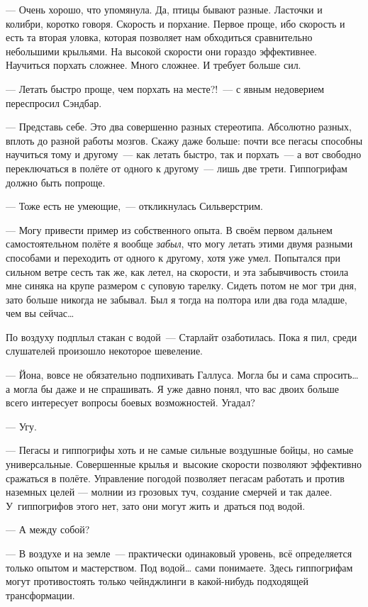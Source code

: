 \documentclass[fontsize=11pt,a5paper,titlepage=firstcover]{scrbook}
\begin{document}
--- Очень хорошо, что упомянула. Да, птицы бывают разные. Ласточки и колибри, коротко говоря. Скорость и порхание. Первое проще, ибо скорость и есть та вторая уловка, которая позволяет нам обходиться сравнительно небольшими крыльями. На высокой скорости они гораздо эффективнее. Научиться порхать сложнее. Много сложнее. И требует больше сил.

--- Летать быстро проще, чем порхать на месте?!~--- с явным недоверием переспросил Сэндбар.

--- Представь себе. Это два совершенно разных стереотипа. Абсолютно разных, вплоть до разной работы мозгов. Скажу даже больше: почти все пегасы способны научиться тому и другому~--- как летать быстро, так и порхать~--- а вот свободно переключаться в полёте от одного к другому~--- лишь две трети. Гиппогрифам должно быть попроще.

--- Тоже есть не умеющие,~--- откликнулась Сильверстрим.

--- Могу привести пример из собственного опыта. В своём первом дальнем самостоятельном полёте я вообще \emph{забыл}, что могу летать этими двумя разными способами и переходить от одного к другому, хотя уже умел. Попытался при сильном ветре сесть так же, как летел, на скорости, и эта забывчивость стоила мне синяка на крупе размером с суповую тарелку. Сидеть потом не мог три дня, зато больше никогда не забывал. Был я тогда на полтора или два года младше, чем вы сейчас{\ldots}

По воздуху подплыл стакан с водой~--- Старлайт озаботилась. Пока я пил, среди слушателей произошло некоторое шевеление.

--- Йона, вовсе не обязательно подпихивать Галлуса. Могла бы и сама спросить{\ldots} а могла бы даже и не спрашивать. Я уже давно понял, что вас двоих больше всего интересует вопросы боевых возможностей. Угадал?

--- Угу.

--- Пегасы и гиппогрифы хоть и не самые сильные воздушные бойцы, но самые универсальные. Совершенные крылья и~высокие скорости позволяют эффективно сражаться в полёте. Управление погодой позволяет пегасам работать и против наземных целей --- молнии из грозовых туч, создание смерчей и так далее. У~гиппогрифов этого нет, зато они могут жить и~драться под водой.

--- А между собой?

--- В воздухе и на земле~--- практически одинаковый уровень, всё определяется только опытом и мастерством. Под водой{\ldots} сами понимаете. Здесь гиппогрифам могут противостоять только чейнджлинги в какой-нибудь подходящей трансформации.
\end{document}
